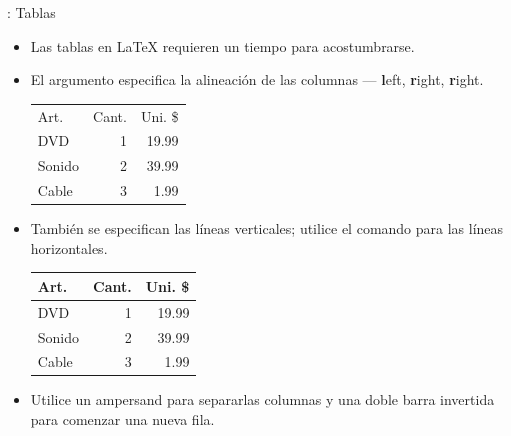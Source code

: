 \documentclass{beamer}
\begin{document}
\begin{frame}[fragile]{\insertsection: Tablas}
  \begin{itemize}
  \item Las tablas en \LaTeX{} requieren un tiempo para acostumbrarse.
  \item El argumento especifica la alineación de las columnas ---
\textbf{l}eft, \textbf{r}ight, \textbf{r}ight.
    \begin{exampletwouptiny}
\begin{tabular}{lrr}
  Art.   & Cant. & Uni. \$ \\
  DVD    & 1     & 19.99   \\
  Sonido & 2     & 39.99   \\
  Cable  & 3     & 1.99    \\
\end{tabular}
    \end{exampletwouptiny}
  \item También se especifican las líneas verticales; utilice el
comando  para las líneas horizontales.
    \begin{exampletwouptiny}
\begin{tabular}{|l|r|r|}     \hline
  Art.   & Cant. & Uni. \$ \\\hline
  DVD    & 1     & 19.99   \\
  Sonido & 2     & 39.99   \\
  Cable  & 3     & 1.99    \\\hline
\end{tabular}
    \end{exampletwouptiny}
  \item Utilice un ampersand \keystrokebftt{\&} para separarlas
columnas y una doble barra invertida
\keystrokebftt{\bs}\keystrokebftt{\bs} para comenzar una nueva
fila.
  \end{itemize}
\end{frame}
\end{document}
